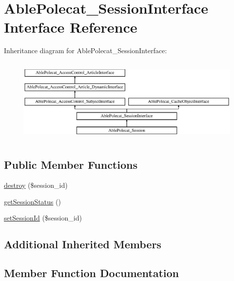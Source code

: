 \hypertarget{interface_able_polecat___session_interface}{}\section{Able\+Polecat\+\_\+\+Session\+Interface Interface Reference}
\label{interface_able_polecat___session_interface}
Inheritance diagram for Able\+Polecat\+\_\+\+Session\+Interface\+:\begin{figure}[H]
\begin{center}
\leavevmode
\includegraphics[height=4.268293cm]{interface_able_polecat___session_interface}
\end{center}
\end{figure}
\subsection*{Public Member Functions}
\begin{DoxyCompactItemize}
\item 
\hyperlink{interface_able_polecat___session_interface_aaec5812f6b4eb6835f88d3baa06a002a}{destroy} (\$session\+\_\+id)
\item 
\hyperlink{interface_able_polecat___session_interface_a4f9d8c32820bd2ece69d36d4375baa6b}{get\+Session\+Status} ()
\item 
\hyperlink{interface_able_polecat___session_interface_a89c236b6e327f2fe058c4a7b32a10f9d}{set\+Session\+Id} (\$session\+\_\+id)
\end{DoxyCompactItemize}
\subsection*{Additional Inherited Members}


\subsection{Member Function Documentation}
\hypertarget{interface_able_polecat___session_interface_aaec5812f6b4eb6835f88d3baa06a002a}{}

